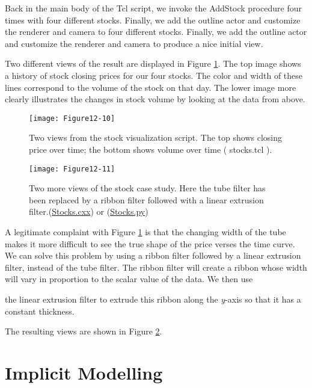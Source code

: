 Back in the main body of the Tcl script, we invoke the AddStock procedure four times with four different stocks. Finally, we add the outline actor and customize the renderer and camera to  four different stocks. Finally, we add the outline actor and customize the renderer and camera to produce a nice initial view.

Two different views of the result are displayed in Figure \ref{fig:Figure12-10}. The top image shows a history of stock closing prices for our four stocks. The color and width of these lines correspond to the volume of the stock on that day. The lower image more clearly illustrates the changes in stock volume by looking at the data from above.

\begin{figure}[!htb]
	\centering
	\texttt{[image: Figure12-10]}
	\caption{Two views from the stock visualization script. The top shows closing price over time; the bottom shows volume over time ( stocks.tcl ).}
	\label{fig:Figure12-10}
\end{figure}

\begin{figure}[!htb]
	\centering
	\texttt{[image: Figure12-11]}
	\caption{Two more views of the stock case study. Here the
		tube filter has been replaced by a ribbon filter followed with a
		linear extrusion filter.(\href{https://lorensen.github.io/VTKExamples/site/Cxx/VisualizationAlgorithms/Stocks/}{Stocks.cxx}) or (\href{https://lorensen.github.io/VTKExamples/site/Python//VisualizationAlgorithms/Stocks/}{Stocks.py})}
	\label{fig:Figure12-11}
\end{figure}

A legitimate complaint with Figure \ref{fig:Figure12-10} is that the changing
width of the tube makes it more difficult to see the true shape of the
price verses the time curve. We can solve this problem by using a
ribbon filter followed by a linear extrusion filter, instead of the
tube filter. The ribbon filter will create a ribbon whose width will
vary in proportion to the scalar value of the data. We then use

the linear extrusion filter to extrude this ribbon along the \emph{y}-axis
so that it has a constant thickness.

The resulting views are shown in Figure \ref{fig:Figure12-11}.

\section{Implicit Modelling}

